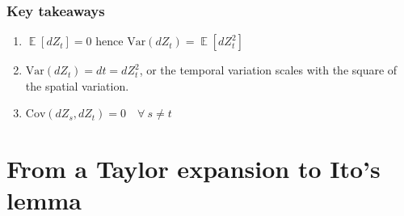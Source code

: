 \documentclass[12pt]{article}
\DeclareMathOperator*{\E}{\mathbb{E}}
\begin{document}
\subsubsection{Key takeaways} \label{KeyProperties_BrownianMotion}
\begin{enumerate}
	\item $\E\left[dZ_t\right]=0$ hence $\mathrm{Var}(dZ_t)=\E\left[dZ_t^2\right]$
	\item $\mathrm{Var}(dZ_t)=dt=dZ_t^2$, or the temporal variation scales with the square of the spatial variation. \label{dZVsdt}
	\item $\mathrm{Cov}(dZ_s,dZ_t)=0\quad\forall\: s\not=t$
\end{enumerate}








\section{From a Taylor expansion to Ito's lemma}
\end{document}
